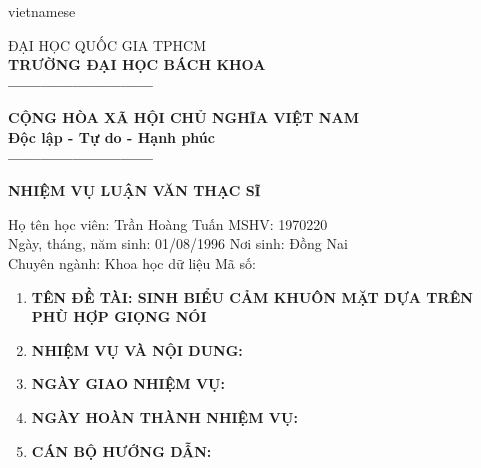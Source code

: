 \begin{titlepage}
\begin{otherlanguage*}{vietnamese}

    \begin{minipage}[t]{0.42\textwidth}
        \begin{center}
            \fontsize{11.5}{11.5}ĐẠI HỌC QUỐC GIA TPHCM\\
            \textbf{TRƯỜNG ĐẠI HỌC BÁCH KHOA}\\
            \textbf{---------------------------}\\
        \end{center}
    \end{minipage}
    \noindent
    \begin{minipage}[t]{0.57\textwidth}
        \begin{center}
            \fontsize{11.5}{11.5}\textbf{CỘNG HÒA XÃ HỘI CHỦ NGHĨA VIỆT NAM}\\
            \textbf{Độc lập - Tự do - Hạnh phúc}\\
            \textbf{---------------------------}\\
        \end{center}
    \end{minipage}

    \begin{center}
        \fontsize{18}{18}\textbf{NHIỆM VỤ LUẬN VĂN THẠC SĨ}
    \end{center}

    \begin{flushleft}
        Họ tên học viên: Trần Hoàng Tuấn
        \tabto{10cm}
        MSHV: 1970220\\
        Ngày, tháng, năm sinh: 01/08/1996
        \tabto{10cm}
        Nơi sinh: Đồng Nai\\
        Chuyên ngành: Khoa học dữ liệu
        \tabto{10cm}
        Mã số:\\

        \renewcommand{\labelenumi}{\Roman{enumi}}
        \begin{enumerate}
            \item \textbf{TÊN ĐỀ TÀI: SINH BIỂU CẢM KHUÔN MẶT DỰA TRÊN PHÙ HỢP GIỌNG NÓI}
            \item \textbf{NHIỆM VỤ VÀ NỘI DUNG:}
            \item \textbf{NGÀY GIAO NHIỆM VỤ:}
            \item \textbf{NGÀY HOÀN THÀNH NHIỆM VỤ:}
            \item \textbf{CÁN BỘ HƯỚNG DẪN:}
        \end{enumerate}
    \end{flushleft}


\end{otherlanguage*}
\end{titlepage}
